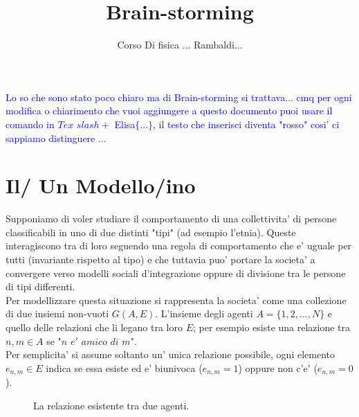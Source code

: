 \documentclass[12pt,titlepage]{article}
\title{Brain-storming}
\author{Corso Di fisica ... Rambaldi... }
\newcommand{\Andr}[1]{\textcolor{blue}{#1}}
\begin{document}
\maketitle
\Andr{ Lo so che sono stato poco chiaro ma di Brain-storming si trattava... cmq per ogni modifica o chiarimento che vuoi aggiungere a questo documento puoi usare il comando in $Tex$ $slash + $ Elisa$\{ ... \} $, il testo che inserisci diventa "rosso"  cosi'  ci sappiamo distinguere ...}


\section*{Il/ Un Modello/ino}
Supponiamo di voler studiare il comportamento di una collettivita' di persone classificabili in uno di due distinti "tipi" (ad esempio l'etnia). Queste interagiscono tra di loro seguendo una regola di comportamento che e' uguale per tutti (invariante rispetto al tipo) e che tuttavia puo' portare la societa' a convergere verso modelli sociali d'integrazione oppure di divisione tra le persone di tipi differenti.\\

Per modellizzare questa situazione si rappresenta la societa' come una collezione di due insiemi non-vuoti $G(A,E)$. L'insieme degli agenti $A=\{1,2,...,N\}$ e quello delle relazioni che li legano tra loro $E$; per esempio esiste una relazione tra $n,m\in A$  se "$n$ $e'$ $amico$ $di$ $m$".\\ 
Per semplicita' si assume soltanto un' unica relazione possibile,
ogni elemento $e_{n,m} \in E$ indica se essa esiste ed e' biunivoca ($e_{n,m}=1$) oppure non c'e' ($e_{n,m}=0$).
\begin{figure} 
\centering
{} 
 \caption{\label{links} La relazione esistente tra due agenti.}
\end{figure}
\end{document}
